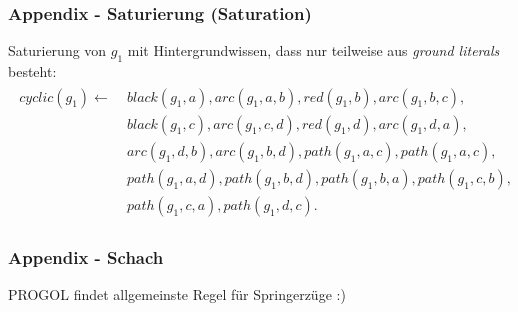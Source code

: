 \begin{frame}
	\frametitle{Appendix - Saturierung (Saturation)}
	Saturierung von $g_1$ mit Hintergrundwissen, dass nur teilweise
	aus \textit{ground literals} besteht:
	\begin{align*}
		\begin{split}
		cyclic(g_1) \leftarrow &\;
		black(g_1, a) , arc(g_1, a, b), red(g_1, b)   , arc(g_1, b, c),\\
		&\;black(g_1, c) , arc(g_1, c, d), red(g_1, d) , arc(g_1, d, a),\\
		&\;arc(g_1, d, b), arc(g_1, b, d), path(g_1, a, c) ,path(g_1, a, c),\\
		&\;path(g_1, a, d) ,path(g_1, b, d) ,path(g_1, b, a) ,path(g_1, c, b),\\
		&\;path(g_1, c, a) ,path(g_1, d, c).
		\end{split}
	\end{align*}
\end{frame}

\begin{frame}
	\frametitle{Appendix - Schach}
	PROGOL findet allgemeinste Regel für Springerzüge :)
\end{frame}
